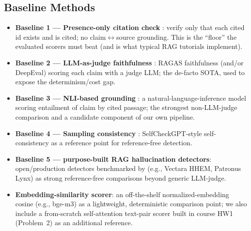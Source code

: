 \subsection{Baseline Methods}
\begin{itemize}
  \item \textbf{Baseline 1 --- Presence-only citation check} \citep{gao2023alce}:
  verify only that each cited id exists and is cited; no claim$\leftrightarrow$source
  grounding. This is the ``floor'' the evaluated scorers must beat (and is what typical RAG
  tutorials implement).
  \item \textbf{Baseline 2 --- LLM-as-judge faithfulness} \citep{es2024ragas}:
  RAGAS faithfulness (and/or DeepEval) scoring each claim with a judge LLM;
  the de-facto SOTA, used to expose the determinism/cost gap.
  \item \textbf{Baseline 3 --- NLI-based grounding} \citep{honovich2022true}:
  a natural-language-inference model scoring entailment of claim by cited passage;
  the strongest non-LLM-judge comparison and a candidate component of our own pipeline.
  \item \textbf{Baseline 4 --- Sampling consistency} \citep{manakul2023selfcheckgpt}:
  SelfCheckGPT-style self-consistency as a reference point for reference-free detection.
  \item \textbf{Baseline 5 --- purpose-built RAG hallucination detectors}: open/production
  detectors benchmarked by \citet{sardana2025realtime} (e.g., Vectara HHEM, Patronus Lynx)
  as strong reference-free comparisons beyond generic LLM-judge.
  \item \textbf{Embedding-similarity scorer}: an off-the-shelf normalized-embedding cosine
  (e.g., bge-m3) as a lightweight, deterministic comparison point; we also include a
  from-scratch self-attention text-pair scorer built in course HW1 (Problem~2) as an
  additional reference.
\end{itemize}

